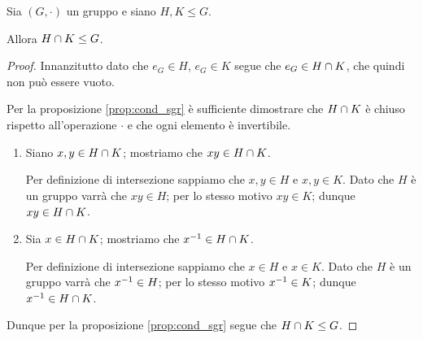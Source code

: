 \begin{proposition}
    Sia $(G, \cdot)$ un gruppo e siano $H, K \leq G$.

    Allora $H \cap K \leq G$.
\end{proposition}
\begin{proof}
    Innanzitutto dato che $e_G \in H$, $e_G \in K$ segue che $e_G \in H \cap K$, che quindi non può essere vuoto.

    Per la proposizione \ref{prop:cond_sgr} è sufficiente dimostrare che $H \cap K$ è chiuso rispetto all'operazione $\cdot$ e che ogni elemento è invertibile.

    \begin{enumerate}[label={(\roman*)}]
        \item Siano $x, y \in H \cap K$; mostriamo che $xy \in H \cap K$.
        
        Per definizione di intersezione sappiamo che $x, y \in H$ e $x, y \in K$. Dato che $H$ è un gruppo varrà che $xy \in H$; per lo stesso motivo $xy \in K$; dunque $xy \in H \cap K$.

        \item Sia $x \in H \cap K$; mostriamo che $x^{-1} \in H \cap K$.
        
        Per definizione di intersezione sappiamo che $x \in H$ e $x \in K$. Dato che $H$ è un gruppo varrà che $x^{-1} \in H$; per lo stesso motivo $x^{-1} \in K$; dunque $x^{-1} \in H \cap K$.
    \end{enumerate}

    Dunque per la proposizione \ref{prop:cond_sgr} segue che $H \cap K \leq G$.
\end{proof}